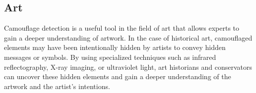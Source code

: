 \begin{multicols}{2}
\vspace{0.5cm}
\subsection{{{\fontsize{14}{19}\selectfont \textbf{Art}}}}
\vspace{0.5cm}
Camouflage detection is a useful tool in the field of art that allows experts to gain a deeper understanding of artwork. In the case of historical art, camouflaged elements may have been intentionally hidden by artists to convey hidden messages or symbols. By using specialized techniques such as infrared reflectography, X-ray imaging, or ultraviolet light, art historians and conservators can uncover these hidden elements and gain a deeper understanding of the artwork and the artist's intentions.

\vspace{0.5cm}

\end{multicols}
